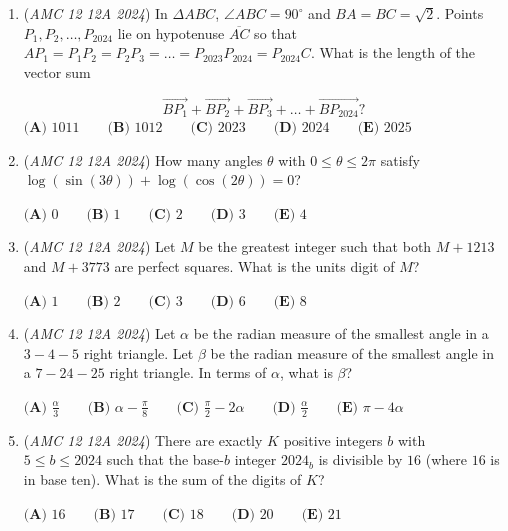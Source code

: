 \begin{enumerate}
 $\textbf{(A) } 2 \qquad \textbf{(B) } 3 \qquad \textbf{(C) } 5 \qquad \textbf{(D) } 6 \qquad \textbf{(E) } 13$


	\item (\textit{AMC 12 12A 2024}) In $\Delta ABC$, $\angle ABC = 90^\circ$ and $BA = BC = \sqrt{2}$. Points $P_1, P_2, \dots, P_{2024}$ lie on hypotenuse $\overline{AC}$ so that $AP_1= P_1P_2 = P_2P_3 = \dots = P_{2023}P_{2024} = P_{2024}C$. What is the length of the vector sum

 \[\overrightarrow{BP_1} + \overrightarrow{BP_2} + \overrightarrow{BP_3} + \dots + \overrightarrow{BP_{2024}}?\]
$\textbf{(A) }1011 \qquad \textbf{(B) }1012 \qquad \textbf{(C) }2023 \qquad \textbf{(D) }2024 \qquad \textbf{(E) }2025 \qquad$


	\item (\textit{AMC 12 12A 2024}) How many angles $\theta$ with $0\le\theta\le2\pi$ satisfy $\log(\sin(3\theta))+\log(\cos(2\theta))=0$?  


 $\textbf{(A) }0 \qquad \textbf{(B) }1 \qquad \textbf{(C) }2 \qquad \textbf{(D) }3 \qquad \textbf{(E) }4 \qquad$


	\item (\textit{AMC 12 12A 2024}) Let $M$ be the greatest integer such that both $M + 1213$ and $M + 3773$ are perfect squares. What is the units digit of $M$?


 $\textbf{(A) }1 \qquad \textbf{(B) }2 \qquad \textbf{(C) }3 \qquad \textbf{(D) }6 \qquad \textbf{(E) }8 \qquad$


	\item (\textit{AMC 12 12A 2024}) Let $\alpha$ be the radian measure of the smallest angle in a $3{-}4{-}5$ right triangle. Let $\beta$ be the radian measure of the smallest angle in a $7{-}24{-}25$ right triangle. In terms of $\alpha$, what is $\beta$?


 $\textbf{(A) }\frac{\alpha}{3}\qquad \textbf{(B) }\alpha - \frac{\pi}{8}\qquad \textbf{(C) }\frac{\pi}{2} - 2\alpha \qquad \textbf{(D) }\frac{\alpha}{2}\qquad \textbf{(E) }\pi - 4\alpha\qquad$


	\item (\textit{AMC 12 12A 2024}) There are exactly $K$ positive integers $b$ with $5 \leq b \leq 2024$ such that the base-$b$ integer $2024_b$ is divisible by $16$ (where $16$ is in base ten). What is the sum of the digits of $K$?


 $\textbf{(A) }16\qquad\textbf{(B) }17\qquad\textbf{(C) }18\qquad\textbf{(D) }20\qquad\textbf{(E) }21$



\end{enumerate}
